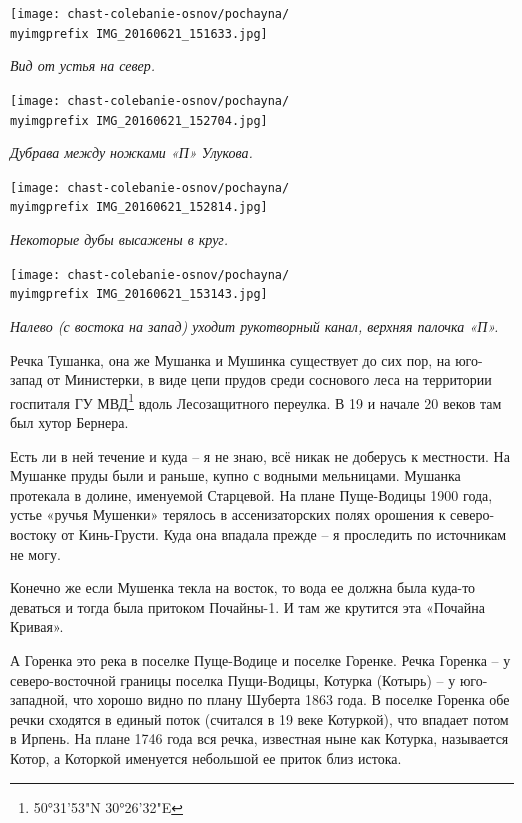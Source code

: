 \begin{center}
\texttt{[image: chast-colebanie-osnov/pochayna/\\myimgprefix IMG\_20160621\_151633.jpg]}

\textit{Вид от устья на север.}
\end{center}

\begin{center}
\texttt{[image: chast-colebanie-osnov/pochayna/\\myimgprefix IMG\_20160621\_152704.jpg]}

\textit{Дубрава между ножками «П» Улукова.}
\end{center}

\newpage
  
\begin{center}
\texttt{[image: chast-colebanie-osnov/pochayna/\\myimgprefix IMG\_20160621\_152814.jpg]}

\textit{Некоторые дубы высажены в круг.}
\end{center}
 
\begin{center}
\texttt{[image: chast-colebanie-osnov/pochayna/\\myimgprefix IMG\_20160621\_153143.jpg]}

\textit{Налево (с востока на запад) уходит рукотворный канал, верхняя палочка «П».}
\end{center}

Речка Тушанка, она же Мушанка и Мушинка существует до сих пор, на юго-запад от Министерки, в виде цепи прудов среди соснового леса на территории госпиталя ГУ МВД\footnote{50°31'53"N 30°26'32"E} вдоль Лесозащитного переулка. В 19 и начале 20 веков там был хутор Бернера.

Есть ли в ней течение и куда – я не знаю, всё никак не доберусь к местности. На Мушанке пруды были и раньше, купно с водными мельницами. Мушанка протекала в долине, именуемой Старцевой. На плане Пуще-Водицы 1900 года, устье «ручья Мушенки» терялось в ассенизаторских полях орошения к северо-востоку от Кинь-Грусти. Куда она впадала прежде – я проследить по источникам не могу.

Конечно же если Мушенка текла на восток, то вода ее должна была куда-то деваться и тогда была притоком Почайны-1. И там же крутится эта «Почайна Кривая».

А Горенка это река в поселке Пуще-Водице и поселке Горенке. Речка Горенка – у северо-восточной границы поселка Пущи-Водицы, Котурка (Котырь) – у юго-западной, что хорошо видно по плану Шуберта 1863 года. В поселке Горенка обе речки сходятся в единый поток (считался в 19 веке Котуркой), что впадает потом в Ирпень. На плане 1746 года вся речка, известная ныне как Котурка, называется Котор, а Которкой именуется небольшой ее приток близ истока.

